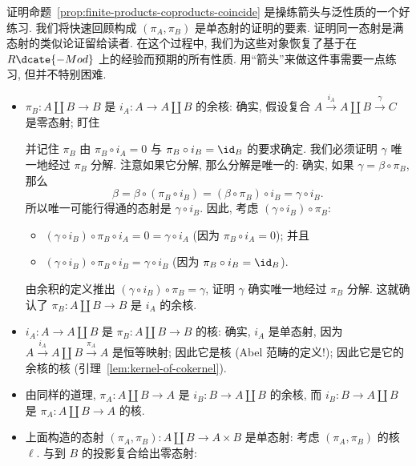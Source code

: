 \indent 证明命题~\ref{prop:finite-products-coproducts-coincide} 是操练箭头与泛性质的一个好练习. 我们将快速回顾构成 $(\pi_A,\pi_B)$ 是单态射的证明的要素. 证明同一态射是满态射的类似论证留给读者.
在这个过程中, 我们为这些对象恢复了基于在 $R\dcate{-Mod}$ 上的经验而预期的所有性质. 用``箭头''来做这件事需要一点练习, 但并不特别困难.
\begin{itemize}
\item $\pi_B:A\amalg B\to B$ 是 $i_A:A\to A\amalg B$ 的余核:
\indent 确实, 假设复合 $A\xrightarrow{i_A}A\amalg B\xrightarrow{\gamma}C$ 是零态射; 盯住
\begin{center}
\end{center}
并记住 $\pi_B$ 由 $\pi_B\circ i_A=0$ 与 $\pi_B\circ i_B=\id_B$ 的要求确定. 我们必须证明 $\gamma$ 唯一地经过 $\pi_B$ 分解. 注意如果它分解, 那么分解是唯一的: 确实, 如果 $\gamma=\beta\circ\pi_B$, 那么
\[
\beta=\beta\circ(\pi_B\circ i_B)=(\beta\circ\pi_B)\circ i_B=\gamma\circ i_B.
\]
所以唯一可能行得通的态射是 $\gamma\circ i_B$. 因此, 考虑 $(\gamma\circ i_B)\circ\pi_B$:
\begin{itemize}
\item[---] $(\gamma\circ i_B)\circ\pi_B\circ i_A=0=\gamma\circ i_A$ (因为 $\pi_B\circ i_A=0$); 并且
\item[---] $(\gamma\circ i_B)\circ\pi_B\circ i_B=\gamma\circ i_B$ (因为 $\pi_B\circ i_B=\id_B$).
\end{itemize}
由余积的定义推出 $(\gamma\circ i_B)\circ\pi_B=\gamma$, 证明 $\gamma$ 确实唯一地经过 $\pi_B$ 分解. 这就确认了 $\pi_B:A\amalg B\to B$ 是 $i_A$ 的余核.
\item $i_A:A\to A\amalg B$ 是 $\pi_B:A\amalg B\to B$ 的核:
\indent 确实, $i_A$ 是单态射, 因为 $A\xrightarrow{i_A} A\amalg B\xrightarrow{\pi_A} A$ 是恒等映射; 因此它是核 (Abel 范畴的定义!); 因此它是它的余核的核 (引理~\ref{lem:kernel-of-cokernel}).
\item 由同样的道理, $\pi_A:A\amalg B\to A$ 是 $i_B:B\to A\amalg B$ 的余核, 而 $i_B:B\to A\amalg B$ 是 $\pi_A:A\amalg B\to A$ 的核.
\item 上面构造的态射 $(\pi_A,\pi_B):A\amalg B\to A\times B$ 是单态射:
\indent 考虑 $(\pi_A,\pi_B)$ 的核 $\ell$. 与到 $B$ 的投影复合给出零态射:
\begin{center}
\begin{tikzcd}

\end{tikzcd}
\end{center}
\end{itemize}
